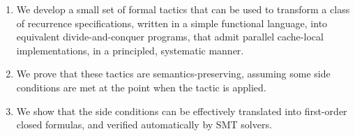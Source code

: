 \begin{enumerate}
  \item We develop a small set of formal tactics that can be used to transform a class of recurrence
  specifications, written in a simple functional language, 
  into equivalent divide-and-conquer programs, that admit parallel cache-local
  implementations, in a principled, systematic manner.
  \item We prove that these tactics are semantics-preserving, assuming some side conditions are met
  at the point when the tactic is applied.
  \item We show that the side conditions can be effectively translated into first-order closed
  formulas, and verified automatically by SMT solvers.
\end{enumerate}

